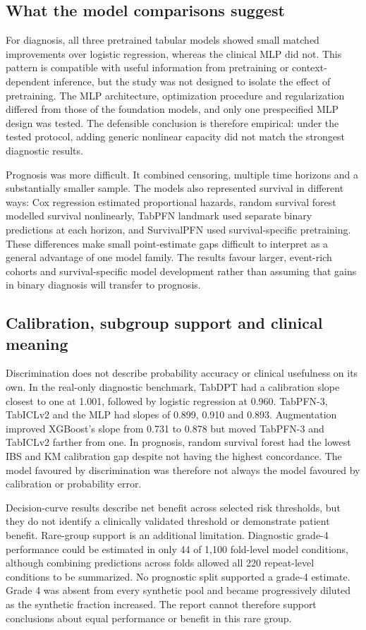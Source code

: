 \subsection{What the model comparisons suggest}

For diagnosis, all three pretrained tabular models showed small matched
improvements over logistic regression, whereas the clinical MLP did not.  This
pattern is compatible with useful information from pretraining or
context-dependent inference, but the study was not designed to isolate the
effect of pretraining.  The MLP architecture, optimization procedure and
regularization differed from those of the foundation models, and only one
prespecified MLP design was tested.  The defensible conclusion is therefore
empirical: under the tested protocol, adding generic nonlinear capacity did not
match the strongest diagnostic results.

Prognosis was more difficult.  It combined censoring, multiple time horizons
and a substantially smaller sample.  The models also represented survival in
different ways: Cox regression estimated proportional hazards, random survival
forest modelled survival nonlinearly, TabPFN landmark used separate binary
predictions at each horizon, and SurvivalPFN used survival-specific pretraining.
These differences make small point-estimate gaps difficult to interpret as a
general advantage of one model family.  The results favour larger, event-rich
cohorts and survival-specific model development rather than assuming that gains
in binary diagnosis will transfer to prognosis.

\subsection{Calibration, subgroup support and clinical meaning}

Discrimination does not describe probability accuracy or clinical usefulness
on its own.  In the real-only diagnostic benchmark, TabDPT had a calibration
slope closest to one at 1.001, followed by logistic regression at 0.960.
TabPFN-3, TabICLv2 and the MLP had slopes of 0.899, 0.910 and 0.893.
Augmentation improved XGBoost's slope from 0.731 to 0.878 but moved TabPFN-3 and
TabICLv2 farther from one.  In prognosis, random survival forest had the lowest
IBS and KM calibration gap despite not having the highest concordance.  The
model favoured by discrimination was therefore not always the model favoured by
calibration or probability error.

Decision-curve results describe net benefit across selected risk thresholds,
but they do not identify a clinically validated threshold or demonstrate
patient benefit.  Rare-group support is an additional limitation.  Diagnostic
grade-4 performance could be estimated in only 44 of 1,100 fold-level
model conditions, although combining predictions across folds allowed all 220
repeat-level conditions to be summarized.  No prognostic split supported a
grade-4 estimate.  Grade 4 was absent from every synthetic pool and became
progressively diluted as the synthetic fraction increased.  The report cannot
therefore support conclusions about equal performance or benefit in this rare
group.

